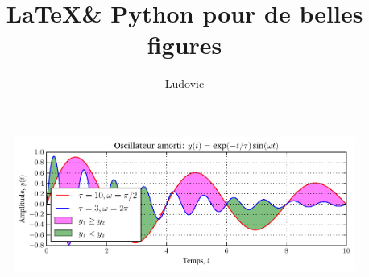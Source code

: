 \documentclass[10pt,a4paper,twoside]{article}
\author{Ludovic}
\title{\LaTeX \& Python pour de belles figures}
\begin{document}
\maketitle

\blindmathpaper

\begin{figure}[htb]
\centerline{\includegraphics{fig}}
\caption{\lipsum[1]}
\end{figure}



\blindmathpaper
\end{document}
